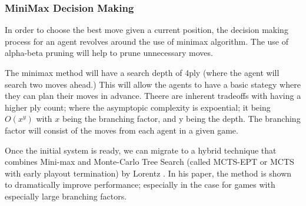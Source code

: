 \documentclass[12pt,a4paper]{article}
\begin{document}
\subsubsection{MiniMax Decision Making}

    In order to choose the best move given a current position, the decision making process for an agent revolves around the use of minimax algorithm. The use of alpha-beta pruning will help to prune unnecessary moves.

    The minimax method will have a search depth of 4ply (where the agent will search two moves ahead.) This will allow the agents to have a basic stategy where they can plan their moves in advance. Theere are inherent tradeoffs with having a higher ply count; where the asymptopic complexity is expoential; it being $O(x^y)$ with $x$ being the branching factor, and y being the depth. The branching factor will consist of the moves from each agent in a given game.

    Once the initial system is ready, we can migrate to a hybrid technique that combines Mini-max and Monte-Carlo Tree Search (called MCTS-EPT or MCTS with early playout termination) by Lorentz \cite{lorentz_using_2016}. In his paper, the method is shown to dramatically improve performance; especially in the case for games with especially large branching factors. 
\end{document}
